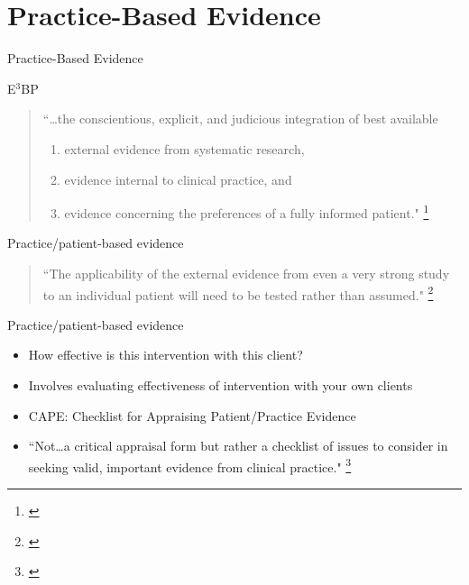 \documentclass{beamer}
\begin{document}
\section{Practice-Based Evidence}

\begin{frame}
	\begin{center}
	\huge{Practice-Based Evidence}
	\end{center}
\end{frame}

% 
\begin{frame}{E$^3$BP}
	\begin{quote}
	``\dots the conscientious, explicit, and judicious integration of  best available\\
		\begin{enumerate}
		\item external \alert{evidence} from systematic research,
		\item \alert{evidence} internal to clinical practice, and
		\item \alert{evidence} concerning the preferences of a fully informed patient."  \footnote{\tiny{\citet[p. 2]{Dollaghan2007a}}}
		\end{enumerate}
	\end{quote}
\end{frame}

% 
\begin{frame}{Practice/patient-based evidence}
	\begin{quote}
	``The applicability of the external evidence from even a very strong study to an individual patient will need to be \alert{tested} rather than \alert{assumed}." \footnote{\tiny{\citet[p. 115]{Dollaghan2007a}}}
	\end{quote}
\end{frame}

\begin{frame}{Practice/patient-based evidence}
	\begin{itemize}
	\item How effective is this intervention with this client?
	\item Involves evaluating effectiveness of intervention \alert{with your own clients}
	\item CAPE: Checklist for Appraising Patient/Practice Evidence 
	\item ``Not\dots a critical appraisal form but rather a checklist of issues to consider in seeking valid, important evidence from clinical practice." \footnote{\tiny{\citet[p. 115]{Dollaghan2007a}}}
	\end{itemize}
\end{frame}
\end{document}
